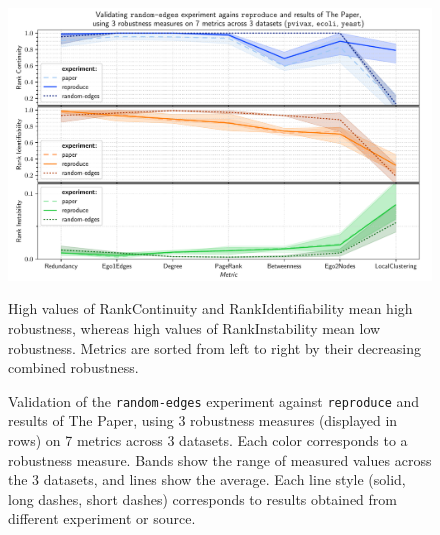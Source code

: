 \begin{figure}
    \includegraphics[width=\linewidth]{plot_random_edges.pdf}
    \vspace*{-0.6cm}
    \caption{Validation of the \texttt{random-edges} experiment against \texttt{reproduce} and results of The Paper, using 3 robustness measures (displayed in rows) on 7 metrics across 3 datasets.
    Each color corresponds to a robustness measure.
    Bands show the range of measured values across the 3 datasets, and lines show the average.
    Each line style (solid, long dashes, short dashes) corresponds to results obtained from different experiment or source.}
    \label{fig:plot_random_edges}
    \footnotesize\justify\vspace{-0.4\baselineskip}
    High values of RankContinuity and RankIdentifiability mean high robustness, whereas high values of RankInstability mean low robustness.
    Metrics are sorted from left to right by their decreasing combined robustness.
\end{figure}

